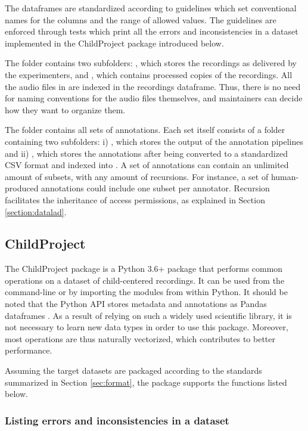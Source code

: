 \documentclass[smallextended]{svjour3}       %
\begin{document}
The dataframes are standardized according to guidelines which set conventional names for the columns and the range of allowed values. The guidelines are enforced through tests which print all the errors and inconsistencies in a dataset implemented in the ChildProject package introduced below.

The  folder contains two subfolders: , which stores the recordings as delivered by the experimenters, and , which contains processed copies of the recordings. All the audio files in  are indexed in the recordings dataframe. Thus, there is no need for naming conventions for the audio files themselves, and maintainers can decide how they want to organize them.

The  folder contains all sets of annotations. Each set itself consists of a folder containing two subfolders: i) , which stores the output of the annotation pipelines and ii) , which stores the annotations after being converted to a standardized CSV format and indexed into . A set of annotations can contain an unlimited amount of subsets, with any amount of recursions. For instance, a set of human-produced annotations could include one subset per annotator. Recursion facilitates the inheritance of access permissions, as explained in Section \ref{section:datalad}.


\subsection{ChildProject}\label{section:childproject}

The ChildProject package is a Python 3.6+ package that performs common operations on a dataset of child-centered recordings. It can be used from the command-line or by importing the modules from within Python. It should be noted that the Python API stores metadata and annotations as Pandas dataframes \citep{pandas-software,pandas-paper}. As a result of relying on such a widely used scientific library, it is not necessary to learn new data types in order to use this package. Moreover, most operations are thus naturally vectorized, which contributes to better performance.

Assuming the target datasets are packaged according to the standards summarized in Section \ref{sec:format}, the package supports the functions listed below.

\subsubsection*{Listing errors and inconsistencies in a dataset}
\end{document}
